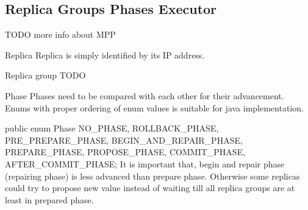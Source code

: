 \subsection{Replica Groups Phases Executor}

TODO more info about MPP


Replica
Replica is simply identified by its IP address. 


Replica group
TODO


Phase
Phases need to be compared with each other for their advancement. Enums with proper ordering of enum values is suitable for java implementation.


public enum Phase
{
   NO_PHASE,
   ROLLBACK_PHASE,
   PRE_PREPARE_PHASE,
   BEGIN_AND_REPAIR_PHASE,
   PREPARE_PHASE,
   PROPOSE_PHASE,
   COMMIT_PHASE,
   AFTER_COMMIT_PHASE;
}
It is important that, begin and repair phase (repairing phase) is less advanced than prepare phase. Otherwise some replicas could try to propose new value instead of waiting till all replica groups are at least in prepared phase.





